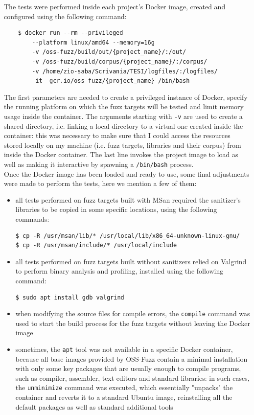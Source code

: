 \newpage
The tests were performed inside each project's Docker image, created and configured using the following command:
\begin{verbatim}
    $ docker run --rm --privileged 
        --platform linux/amd64 --memory=16g 
        -v /oss-fuzz/build/out/{project_name}/:/out/
        -v /oss-fuzz/build/corpus/{project_name}/:/corpus/    
        -v /home/zio-saba/Scrivania/TESI/logfiles/:/logfiles/ 
        -it  gcr.io/oss-fuzz/{project_name} /bin/bash
\end{verbatim}
The first parameters are needed to create a privileged instance of Docker, specify the running platform on which the fuzz targets will be tested and limit memory usage inside the container. The arguments starting with \verb|-v| are used to create a shared directory, i.e. linking a local directory to a virtual one created inside the container: this was necessary to make sure that I could access the resources stored locally on my machine (i.e. fuzz targets, libraries and their corpus) from inside the Docker container. The last line invokes the project image to load as well as making it interactive by spawning a \verb|/bin/bash| process.
\ \\

Once the Docker image has been loaded and ready to use, some final adjustments were made to perform the tests, here we mention a few of them:
\begin{itemize}
    \item all tests performed on fuzz targets built with MSan required the sanitizer's libraries to be copied in some specific locations, using the following commands:
\begin{verbatim}
$ cp -R /usr/msan/lib/* /usr/local/lib/x86_64-unknown-linux-gnu/
$ cp -R /usr/msan/include/* /usr/local/include
\end{verbatim}
    \item all tests performed on fuzz targets built without sanitizers relied on Valgrind to perform binary analysis and profiling, installed using the following command:
\begin{verbatim}
$ sudo apt install gdb valgrind
\end{verbatim} 
    \item when modifying the source files for compile errors, the \verb|compile| command was used to start the build process for the fuzz targets without leaving the Docker image
    \item sometimes, the \verb|apt| tool was not available in a specific Docker container, because all base images provided by OSS-Fuzz contain a minimal installation with only some key packages that are usually enough to compile programs, such as compiler, assembler, text editors and standard libraries: in such cases, the \verb|unminimize| command was executed, which essentially "unpacks" the container and reverts it to a standard Ubuntu image, reinstalling all the default packages as well as standard additional tools
\end{itemize}


